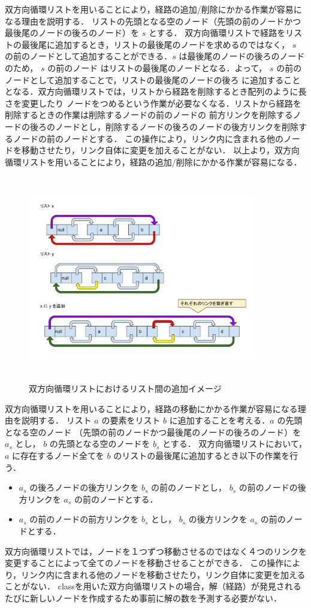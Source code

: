 \documentclass[12pt]{optlab-bachelor}
\begin{document}
双方向循環リストを用いることにより，経路の追加/削除にかかる作業が容易になる理由を説明する．
リストの先頭となる空のノード（先頭の前のノードかつ最後尾のノードの後ろのノード）を $s$ とする．
双方向循環リストで経路をリストの最後尾に追加するとき，リストの最後尾のノードを求めるのではなく，
$s$ の前のノードとして追加することができる．$s$ は最後尾のノードの後ろのノードのため， $s$ の前のノード
はリストの最後尾のノードとなる．よって， $s$ の前のノードとして追加することで，リストの最後尾のノードの後ろ
に追加することとなる．双方向循環リストでは，リストから経路を削除するとき配列のように長さを変更したり
ノードをつめるという作業が必要なくなる．リストから経路を削除するときの作業は削除するノードの前のノードの
前方リンクを削除するノードの後ろのノードとし，削除するノードの後ろのノードの後方リンクを削除するノードの前のノードとする．
この操作により，リンク内に含まれる他のノードを移動させたり，リンク自体に変更を加えることがない．
以上より，双方向循環リストを用いることにより，経路の追加/削除にかかる作業が容易になる．

\begin{figure}[htbp]
  \centering
  \caption{双方向循環リストにおけるリスト間の追加イメージ}
  \includegraphics[height=9.0cm, width=10.0cm]{fig/fig12.pdf}
\end{figure}

双方向循環リストを用いることにより，経路の移動にかかる作業が容易になる理由を説明する．
リスト $a$ の要素をリスト $b$ に追加することを考える．$a$ の先頭となる空のノード
（先頭の前のノードかつ最後尾のノードの後ろのノード）を $a_s$ とし， $b$ の先頭となる空のノードを $b_s$ とする．
双方向循環リストにおいて， $a$ に存在するノード全てを $b$ のリストの最後尾に追加するとき以下の作業を行う．
\begin{itemize}
  \item $a_s$ の後ろノードの後方リンクを $b_s$ の前のノードとし， $b_s$ の前のノードの後方リンクを $a_s$ の前のノードとする．
  \item $a_s$ の前のノードの前方リンクを $b_s$ とし， $b_s$ の後方リンクを $a_s$ の前のノードとする．
\end{itemize}
双方向循環リストでは，ノードを１つずつ移動させるのではなく４つのリンクを変更することによって全てのノードを移動させることができる．
この操作により，リンク内に含まれる他のノードを移動させたり，リンク自体に変更を加えることがない．
classを用いた双方向循環リストの場合，解（経路）が発見されるたびに新しいノードを作成するため事前に解の数を予測する必要がない．
\end{document}
